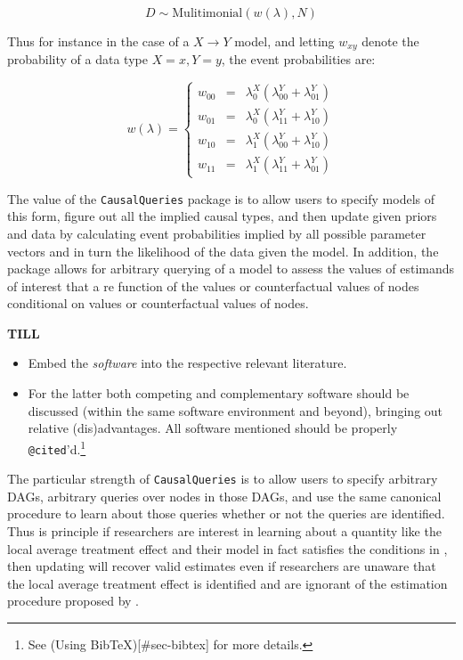 \documentclass[
  11pt,
  article]{jss}
\begin{document}
\[D \sim \text{Mulitimonial}(w(\lambda), N)\]

Thus for instance in the case of a \(X \rightarrow Y\) model, and
letting \(w_{xy}\) denote the probability of a data type \(X=x, Y=y\),
the event probabilities are:

\[w(\lambda) = \left\{\begin{array}{ccc} w_{00} & = & \lambda^X_0(\lambda^Y_{00} + \lambda^Y_{01})\\ 
w_{01} & = & \lambda^X_0(\lambda^Y_{11} + \lambda^Y_{10})\\
w_{10} & = & \lambda^X_1(\lambda^Y_{00} + \lambda^Y_{10})\\
w_{11} & = & \lambda^X_1(\lambda^Y_{11} + \lambda^Y_{01})\end{array} \right.\]

The value of the \texttt{CausalQueries} package is to allow users to
specify models of this form, figure out all the implied causal types,
and then update given priors and data by calculating event probabilities
implied by all possible parameter vectors and in turn the likelihood of
the data given the model. In addition, the package allows for arbitrary
querying of a model to assess the values of estimands of interest that a
re function of the values or counterfactual values of nodes conditional
on values or counterfactual values of nodes.

\textbf{TILL}

\begin{itemize}
\item
  Embed the \emph{software} into the respective relevant literature.
\item
  For the latter both competing and complementary software should be
  discussed (within the same software environment and beyond), bringing
  out relative (dis)advantages. All software mentioned should be
  properly \texttt{@cited}'d.\footnote{See (Using
    BibTeX){[}\#sec-bibtex{]} for more details.}
\end{itemize}

The particular strength of \texttt{CausalQueries} is to allow users to
specify arbitrary DAGs, arbitrary queries over nodes in those DAGs, and
use the same canonical procedure to learn about those queries whether or
not the queries are identified. Thus is principle if researchers are
interest in learning about a quantity like the local average treatment
effect and their model in fact satisfies the conditions in
\citet{angrist1996identification}, then updating will recover valid
estimates even if researchers are unaware that the local average
treatment effect is identified and are ignorant of the estimation
procedure proposed by \citet{angrist1996identification}.
\end{document}
